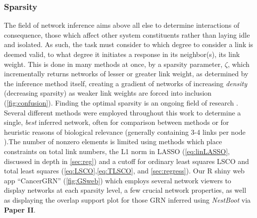 \subsubsection{Sparsity}
\label{sec:spar}
The field of network inference aims above all else to determine interactions of consequence, those which affect other system constituents rather than laying idle and isolated. As such, the task must consider to which degree to consider a link is deemed valid, to what degree it initiates a response in its neighbor(s), \ie its link weight. This is done in many methods at once, by a sparsity parameter, $\zeta$, which incrementally returns networks of lesser or greater link weight, as determined by the inference method itself, creating a gradient of networks of increasing \emph{density} (decreasing sparsity) as weaker link weights are forced into inclusion (\cref{fig:confusion}). Finding the optimal sparsity is an ongoing field of research \citep{tjarnberg2013optimal}. Several different methods were employed throughout this work to determine a single, \emph{best} inferred network, often for comparison between methods or for heuristic reasons of biological relevance (\ie generally containing 3-4 links per node \citep{tjarnberg2013optimal}).The number of nonzero elements is limited using methods which place constraints on total link numbers, \eg the L1 norm in LASSO (\cref{eq:linLASSO}, discussed in depth in \cref{sec:reg}) and a cutoff for ordinary least squares LSCO and total least squares (\cref{eq:LSCO},\cref{eq:TLSCO}, and \cref{sec:regress}). Our R shiny web app ``CancerGRN'' (\cref{fig:GSweb}) which employs several network viewers to display networks at each sparsity level, a few crucial network properties, as well as displaying the overlap support plot for those GRN inferred using \emph{NestBoot} via \textbf{Paper II}.


